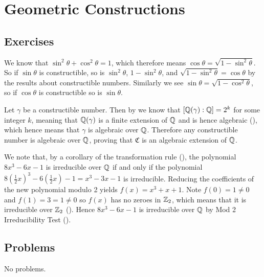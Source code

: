 \section{Geometric Constructions}
\subsection*{Exercises}
\begin{questions}
    \item We know that $\sin^2\theta + \cos^2\theta = 1$, which therefore means $\cos\theta = \sqrt{1-\sin^2\theta}$. So if $\sin\theta$ is constructible, so is $\sin^2\theta$, $1 - \sin^2\theta$, and $\sqrt{1-\sin^2\theta} = \cos\theta$ by the results about constructible numbers. Similarly we see $\sin\theta = \sqrt{1-\cos^2\theta}$, so if $\cos\theta$ is constructible so is $\sin\theta$.

    \item Let $\gamma$ be a constructible number. Then by  we know that $[\mathbb{Q}(\gamma):\mathbb{Q}] = 2^k$ for some integer $k$, meaning that $\mathbb{Q}(\gamma)$ is a finite extension of $\mathbb{Q}$ and is hence algebraic (), which hence means that $\gamma$ is algebraic over $\mathbb{Q}$. Therefore any constructible number is algebraic over $\mathbb{Q}$, proving that $\mathfrak{C}$ is an algebraic extension of $\mathbb{Q}$.

    \item We note that, by a corollary of the transformation rule (), the polynomial $8x^3 - 6x - 1$ is irreducible over $\mathbb{Q}$ if and only if the polynomial $8\left(\frac12x\right)^3 - 6\left(\frac12x\right) - 1 = x^3 - 3x - 1$ is irreducible. Reducing the coefficients of the new polynomial modulo 2 yields $f(x) = x^3 + x + 1$. Note $f(0) = 1 \neq 0$ and $f(1) = 3 = 1 \neq 0$ so $f(x)$ has no zeroes in $\mathbb{Z}_2$, which means that it is irreducible over $\mathbb{Z}_2$ (). Hence $8x^3 - 6x - 1$ is irreducible over $\mathbb{Q}$ by Mod 2 Irreducibility Test ().
\end{questions}

\subsection*{Problems}
No problems.
